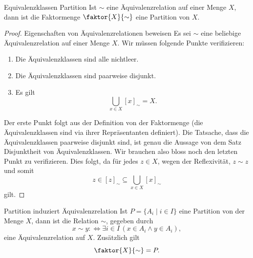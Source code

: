     \begin{lemma}{Equivalenzklassen Partition}
    Ist $\sim$ eine Äquivalenzrelation auf einer Menge $X$, dann ist die Faktormenge $\faktor{X}{\sim}$ eine Partition von $X$.
    \end{lemma}
    
    \begin{proof}{Eigenschaften von Äquivalenzrelationen beweisen}
    Es sei $\sim$ eine beliebige Äquivalenzrelation auf einer Menge $X$. Wir müssen folgende Punkte verifizieren:
    \begin{enumerate}
    \item\label{a} Die Äquivalenzklassen sind alle nichtleer.
    \item\label{2} Die Äquivalenzklassen sind paarweise disjunkt.
    \item\label{3} Es gilt
    \[
    \bigcup_{x\in X}[x]_{\sim}=X.
    \]
    \end{enumerate}
    Der erste Punkt folgt aus der Definition von der Faktormenge (die Äquivalenzklassen sind via ihrer Repräsentanten definiert). Die Tatsache, dass die Äquivalenzklassen paarweise disjunkt sind, ist genau die Aussage von dem Satz Disjunktheit von Äquivalenzklassen. Wir brauchen also bloss noch den letzten Punkt zu verifizieren. Dies folgt, da für jedes $z\in X$, wegen der Reflexivität, $z\sim z$ und somit
    \[
    z\in[z]_\sim\subseteq\bigcup_{x\in X}[x]_\sim
    \]
    gilt.
    \end{proof}



    \begin{lemma}{Partition induziert Äquivalenzrelation}
    Ist $P=\{A_i\mid i\in I\}$ eine Partition von der Menge $X$, dann ist die Relation $\sim$, gegeben durch
    \[
    x\sim y:\Leftrightarrow \exists i\in I\,(x\in A_i\land y\in A_i),
    \]
    eine Äquivalenzrelation auf $X$. Zusätzlich gilt
    \[
    \faktor{X}{\sim}=P.
    \]
    \end{lemma}
    
